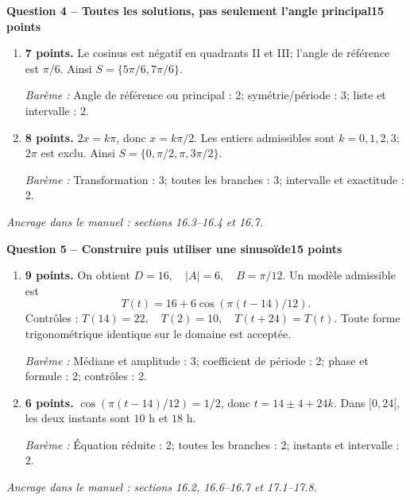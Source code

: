 \documentclass[11pt,a4paper]{article}
\begin{document}
\newpage
{\large\bfseries Question 4 -- Toutes les solutions, pas seulement l’angle principal}\hfill\textbf{15 points}\par
\begin{enumerate}
\item \textbf{7 points.} Le cosinus est négatif en quadrants II et III; l’angle de référence est \(\pi/6\). Ainsi \(S=\{5\pi/6,7\pi/6\}\).
\par{\small\textit{Barème : }Angle de référence ou principal : 2; symétrie/période : 3; liste et intervalle : 2.}
\item \textbf{8 points.} \(2x=k\pi\), donc \(x=k\pi/2\). Les entiers admissibles sont \(k=0,1,2,3\); \(2\pi\) est exclu. Ainsi \(S=\{0,\pi/2,\pi,3\pi/2\}\).
\par{\small\textit{Barème : }Transformation : 3; toutes les branches : 3; intervalle et exactitude : 2.}
\end{enumerate}
\vfill {\small\textit{Ancrage dans le manuel : sections 16.3--16.4 et 16.7.}}

\newpage
{\large\bfseries Question 5 -- Construire puis utiliser une sinusoïde}\hfill\textbf{15 points}\par
\begin{enumerate}
\item \textbf{9 points.} On obtient \(D=16,\quad |A|=6,\quad B=\pi/12\). Un modèle admissible est \[T(t)=16+6\cos(\pi(t-14)/12).\] Contrôles : \(T(14)=22,\quad T(2)=10,\quad T(t+24)=T(t)\). Toute forme trigonométrique identique sur le domaine est acceptée.
\par{\small\textit{Barème : }Médiane et amplitude : 3; coefficient de période : 2; phase et formule : 2; contrôles : 2.}
\item \textbf{6 points.} \(\cos(\pi(t-14)/12)=1/2\), donc \(t=14\pm4+24k\). Dans \([0,24[\), les deux instants sont \(10\) h et \(18\) h.
\par{\small\textit{Barème : }Équation réduite : 2; toutes les branches : 2; instants et intervalle : 2.}
\end{enumerate}
\vfill {\small\textit{Ancrage dans le manuel : sections 16.2, 16.6--16.7 et 17.1--17.8.}}
\end{document}
